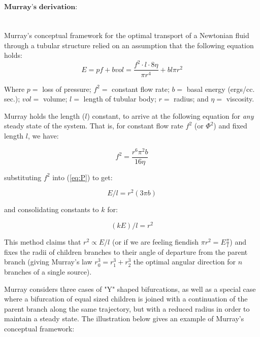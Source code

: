 \begin{enumerate}
   
   $\textbf{Murray's derivation:}$
   \\
   \label{murray}\\
   \\Murray's conceptual framework for the optimal transport of a Newtonian fluid through a tubular structure relied on an assumption that the following equation holds:
   \begin{equation}
   E
   =
   pf
   +
   bvol
   =
   \frac{
   f^2
   \cdot l
   \cdot 8 \eta
   }{
   \pi
   r^4
   }
   +
   bl\pi
   r^2
   \label{eq:P}
   \end{equation}
   
   Where $p =$ loss of pressure; $f^2=$ constant flow rate; $b =$ basal energy (ergs/cc. sec.); $vol =$ volume; $l =$ length of tubular body; $r =$ radius; and $\eta =$ viscosity.

   Murray holds the length ($l$) constant, to arrive at the following equation for \textit{any} steady state of the system. That is, for constant flow rate $f^2$ (or $\Phi^2$) and fixed length $l$, we have:

   \begin{equation}
   f^2
   =
   \frac{
   r^6
   \pi^2
   b
   }
   {
   16\eta
   }
   \label{eq:murrays_sol}
   \end{equation}

   substituting $f^2$ into (\ref{eq:P}) to get:

   \begin{equation}
   E/l = r^2 (3 \pi b)
   \label{eq:E_l}
   \end{equation}
   
   and consolidating constants to $k$ for:
   
   \begin{equation}
   (kE)/l = r^2
   \label{eq:r**2}
   \end{equation}

   This method claims that $r^2 \propto E/l$ (or if we are feeling fiendish $\pi r^2 = E \frac{\pi}{l}$) and fixes the radii of children branches to their angle of departure from the parent branch (giving Murray's law $r_0^3 = r_1^3 + r_2^3$ the optimal angular direction for $n$ branches of a single source).

   Murray considers three cases of "Y" shaped bifurcations, as well as a special case where a bifurcation of equal sized children is joined with a continuation of the parent branch along the same trajectory, but with a reduced radius in order to maintain a steady state. The illustration below gives an example of Murray's conceptual framework:
   

\end{enumerate}
